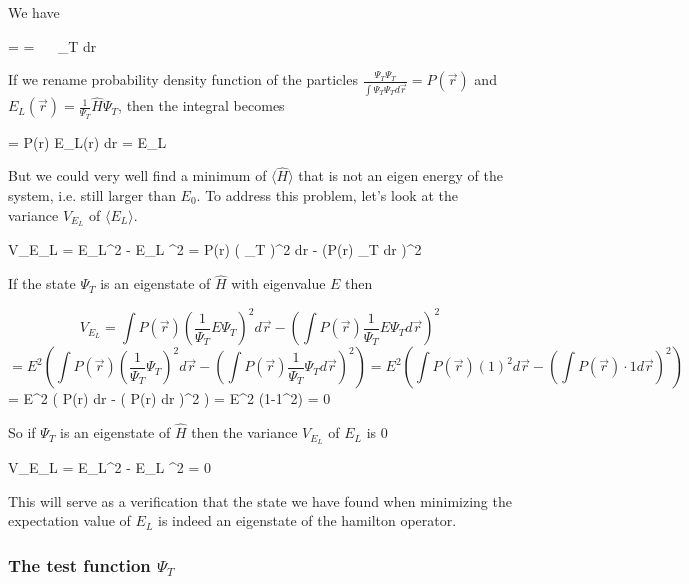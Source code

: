 We have

\eqs
\langle {} \rangle =  
=
\int ~~   \Psi_T d\vec r
\eqf

If we rename probability density function of the particles $\frac{\Psi_T \Psi_T}{\int \Psi_T \Psi_T d\vec r} = P(\vec r)$ and $E_L(\vec r) = \frac{1}{\Psi_T} \hat{H} \Psi_T$, then the integral becomes 

\eqs
\langle {} \rangle = \int P(\vec r) E_L(\vec r) d\vec r = \langle E_L \rangle
\eqf

But we could very well find a minimum of $\langle \hat{H} \rangle$ that is not an eigen energy of the system, i.e. still larger than $E_0$.
To address this problem, let's look at the variance $V_{E_L}$ of $\langle E_L \rangle$. 

\eqs
V_{E_L} = \langle E_L^2 \rangle - \langle E_L \rangle^2
= 
\int P(\vec r) \left (  \Psi_T \right )^2 d\vec r -
\left (\int P(\vec r)   \Psi_T d\vec r \right )^2
\eqf 

If the state $\Psi_T$ is an eigenstate of $\hat{H}$ with eigenvalue $E$ then 

\[
V_{E_L} = \int P(\vec r) \left (\frac{1}{\Psi_T} E \Psi_T \right )^2 d\vec r -
\left (\int P(\vec r) \frac{1}{\Psi_T} E \Psi_T d\vec r \right )^2
\]
\[
=E^2
\left ( 
\int P(\vec r) \left (\frac{1}{\Psi_T} \Psi_T \right )^2 d\vec r -
\left (\int P(\vec r) \frac{1}{\Psi_T} \Psi_T d\vec r \right )^2
\right ) = 
E^2 
\left ( 
\int P(\vec r) (1)^2 d\vec r -
\left ( \int P(\vec r) \cdot 1 d\vec r \right )^2
\right )
\]
\eqs
=
E^2 
\left ( 
\int P(\vec r) d\vec r -
\left ( \int P(\vec r) d\vec r \right )^2
\right ) = E^2 (1-1^2) = 0
\eqf

So if $\Psi_T$ is an eigenstate of $\hat{H}$ then the variance $V_{E_L}$ of $E_L$ is $0$

\eqs
V_{E_L} = \langle E_L^2 \rangle - \langle E_L \rangle^2 = 0
\eqf 

This will serve as a verification that the state we have found when minimizing the expectation value of $E_L$ is indeed an eigenstate of the hamilton operator. 













\subsubsection{The test function $\Psi_T$}

